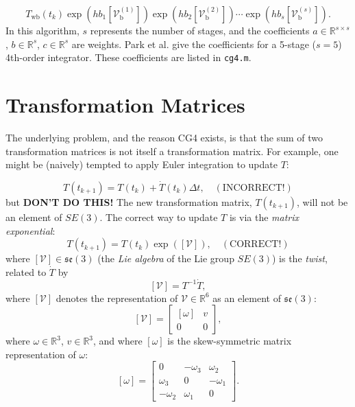 \documentclass[]{article}
\theoremstyle{definition}
\theoremstyle{remark}
\begin{document}
\begin{equation*}
T_\mathrm{wb}\left(t_k\right)\exp\left(h b_1 \left[\mathcal{V}_\mathrm{b}^{(1)}\right]\right)\exp\left(h b_2 \left[\mathcal{V}_\mathrm{b}^{(2)}\right]\right)\cdots \exp\left(h b_s \left[\mathcal{V}_\mathrm{b}^{(s)}\right]\right).
\end{equation*}
In this algorithm, $s$ represents the number of stages, and the coefficients $a\in\mathbb{R}^{s\times s}$, $b\in\mathbb{R}^s$, $c\in\mathbb{R}^s$ are weights. Park et al. give the coefficients for a 5-stage ($s = 5$) 4th-order integrator. These coefficients are listed in \texttt{cg4.m}.

\section{Transformation Matrices}
The underlying problem, and the reason CG4 exists, is that the sum of two transformation matrices is not itself a transformation matrix. For example, one might be (naively) tempted to apply Euler integration to update $T$:

\begin{equation*}
T(t_{k+1}) = T(t_{k}) + \dot{T}(t_k)\Delta t, \quad (\text{INCORRECT!})
\end{equation*}
but \textbf{DON'T DO THIS!}
The new transformation matrix, $T(t_{k+1})$, will not be an element of $SE(3)$.
The correct way to update $T$ is via the \textit{matrix exponential}:
\begin{equation}
	T(t_{k+1}) = T(t_{k})\exp\left(\left[\mathcal{V}\right]\right), \quad (\text{CORRECT!})
\end{equation}
where $\left[\mathcal{V}\right]\in\mathfrak{se}(3)$ (the \textit{Lie algebra} of the Lie group $SE(3)$) is the \textit{twist}, related to $\dot{T}$ by
\begin{equation}
\left[\mathcal{V}\right] = T^{-1}\dot{T},
\end{equation}
where $\left[\mathcal{V}\right]$ denotes the representation of $\mathcal{V}\in\mathbb{R}^6$ as an element of $\mathfrak{se}(3)$:
\begin{equation}
\left[\mathcal{V}\right] = 
\begin{bmatrix}
\left[\omega\right] & v\\
0 & 0
\end{bmatrix},
\end{equation}
where $\omega\in\mathbb{R}^3$, $v\in\mathbb{R}^3$, and where $\left[\omega\right]$ is the skew-symmetric matrix representation of $\omega$:
\begin{equation}
\left[\omega\right] =
\begin{bmatrix}
0 & -\omega_3 & \omega_2 \\
\omega_3 & 0 & -\omega_1 \\
-\omega_2 & \omega_1 & 0
\end{bmatrix}.
\end{equation}
\end{document}
